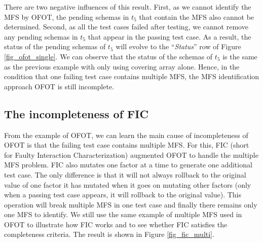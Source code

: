 There are two negative influences of this result. First, as we cannot identify the MFS by OFOT, the pending schemas in $t_{5}$ that contain the MFS also cannot be determined. Second, as all the test cases failed after testing, we cannot remove any pending schemas in $t_{5}$ that appear in the passing test case. As a result, the status of the pending schemas of $t_{5}$ will evolve to the ``\emph{Status}'' row of Figure \ref{fig_ofot_single}. We can observe that the status of the schemas of $t_{5}$ is the same as the previous example with only using covering array alone. Hence, in the condition that one failing test case contains multiple MFS, the MFS identification approach OFOT is still incomplete.


\subsection{The incompleteness of FIC}

From the example of OFOT, we can learn the main cause of incompleteness of OFOT is that the failing test case contains multiple MFS. For this, FIC \cite{zhang2011characterizing} (short for Faulty Interaction Characterization) augmented OFOT to handle the multiple MFS problem.
FIC also mutates one factor at a time to generate one additional test case.  The only difference is that it will not always rollback to the original value of one factor it has mutated when it goes on mutating other factors (only when a passing test case appears, it will rollback to the original value). This operation will break multiple MFS in one test case and finally there remains only one MFS to identify. We still use the same example of multiple MFS used in OFOT to illustrate how FIC works and to see whether FIC satisfies the completeness criteria. The result is shown in Figure \ref{fig_fic_multi}.

